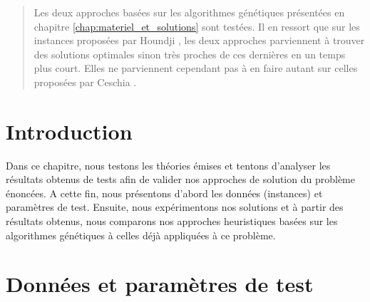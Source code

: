 \begin{abstract}
	Les deux approches basées sur les algorithmes génétiques présentées en chapitre \ref{chap:materiel_et_solutions} sont testées. Il en ressort que sur les instances proposées par Houndji \cite{houndji_thesis}, les deux approches parviennent à trouver des solutions optimales sinon très proches de ces dernières en un temps plus court. Elles ne parviennent cependant pas à en faire autant sur celles proposées par Ceschia \cite{ceschia}.
\end{abstract}

\section*{Introduction}
		Dans ce chapitre, nous testons les théories émises et tentons d'analyser les résultats obtenus de tests afin de valider nos approches de solution du problème énoncées. A cette fin, nous présentons d'abord les données (instances) et paramètres de test. Ensuite, nous expérimentons nos solutions et à partir des résultats obtenus, nous comparons nos approches heuristiques basées sur les algorithmes génétiques à celles déjà appliquées à ce problème.
		
\section{Données et paramètres de test}
